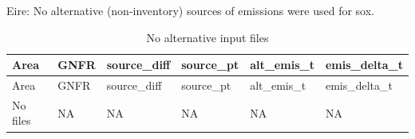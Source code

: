 \documentclass[
]{article}
\begin{document}
Eire: No alternative (non-inventory) sources of emissions were used for
sox.

\begin{longtable}[]{@{}
  >{\centering\arraybackslash}p{}
  >{\centering\arraybackslash}p{}
  >{\centering\arraybackslash}p{}
  >{\centering\arraybackslash}p{}
  >{\centering\arraybackslash}p{}
  >{\centering\arraybackslash}p{}@{}}
\caption{No alternative input files}\tabularnewline
\toprule\noalign{}
\begin{minipage}[b]{\linewidth}\centering
Area
\end{minipage} & \begin{minipage}[b]{\linewidth}\centering
GNFR
\end{minipage} & \begin{minipage}[b]{\linewidth}\centering
source\_diff
\end{minipage} & \begin{minipage}[b]{\linewidth}\centering
source\_pt
\end{minipage} & \begin{minipage}[b]{\linewidth}\centering
alt\_emis\_t
\end{minipage} & \begin{minipage}[b]{\linewidth}\centering
emis\_delta\_t
\end{minipage} \\
\midrule\noalign{}
\endfirsthead
\toprule\noalign{}
\begin{minipage}[b]{\linewidth}\centering
Area
\end{minipage} & \begin{minipage}[b]{\linewidth}\centering
GNFR
\end{minipage} & \begin{minipage}[b]{\linewidth}\centering
source\_diff
\end{minipage} & \begin{minipage}[b]{\linewidth}\centering
source\_pt
\end{minipage} & \begin{minipage}[b]{\linewidth}\centering
alt\_emis\_t
\end{minipage} & \begin{minipage}[b]{\linewidth}\centering
emis\_delta\_t
\end{minipage} \\
\midrule\noalign{}
\endhead
\bottomrule\noalign{}
\endlastfoot
No files & NA & NA & NA & NA & NA \\
\end{longtable}
\end{document}
